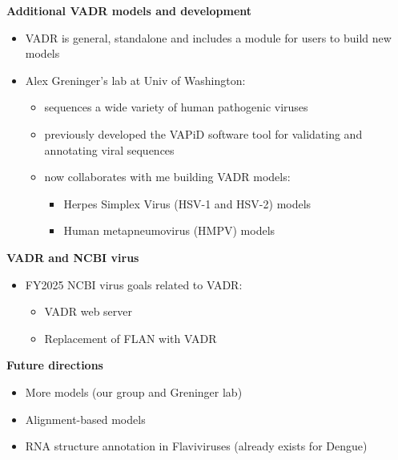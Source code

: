 \documentclass[landscape]{slides}
\begin{document}
\begin{slide}
\begin{center}
  \textbf{Additional VADR models and development}
\end{center}

  \begin{itemize}
  \item VADR is general, standalone and includes a module for users to
    build new models 
  \item Alex Greninger's lab at Univ of Washington:
    \begin {itemize}
    \item sequences a wide variety of human pathogenic viruses
    \item previously developed the VAPiD software tool for validating
      and annotating viral sequences
    \item now collaborates with me building VADR models:
      \begin{itemize}
      \item Herpes Simplex Virus (HSV-1 and HSV-2) models
      \item Human metapneumovirus (HMPV) models
      \end{itemize}
    \end{itemize}
  \end{itemize}

  \vfill
\end{slide}
\begin{slide}
\begin{center}
  \textbf{VADR and NCBI virus}
\end{center}

  \begin{itemize}
  \item FY2025 NCBI virus goals related to VADR:
    \begin{itemize}
    \item VADR web server
    \item Replacement of FLAN with VADR
    \end{itemize}
  \end{itemize}
  \vfill

\end{slide}
\begin{slide}
\begin{center}
  \textbf{Future directions}
\end{center}

  \begin{itemize}
  \item More models (our group and Greninger lab)
  \item Alignment-based models 
  \item RNA structure annotation in Flaviviruses (already exists for Dengue)
  \end{itemize}
  \vfill

\end{slide}
\end{document}
